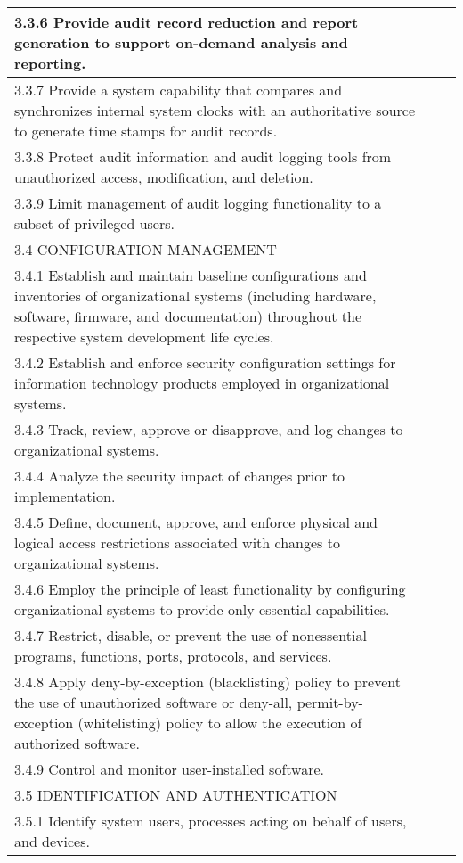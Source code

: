 \begin{longtable} {|p{}|p{}|p{} |}
{3.3.6 Provide audit record reduction and report generation to support on-demand analysis and reporting.}&& \\ \hline
{3.3.7 Provide a system capability that compares and synchronizes internal system clocks with an authoritative source to generate time stamps for audit records.}&& \\ \hline
{3.3.8 Protect audit information and audit logging tools from unauthorized access, modification, and deletion.}&& \\ \hline
{3.3.9 Limit management of audit logging functionality to a subset of privileged users.}&& \\ \hline
{3.4 CONFIGURATION MANAGEMENT}&& \\ \hline
{3.4.1 Establish and maintain baseline configurations and inventories of organizational systems (including hardware, software, firmware, and documentation) throughout the respective system development life cycles.}&& \\ \hline
{3.4.2 Establish and enforce security configuration settings for information technology products employed in organizational systems.}&& \\ \hline
{3.4.3 Track, review, approve or disapprove, and log changes to organizational systems.}&& \\ \hline
{3.4.4 Analyze the security impact of changes prior to implementation.}&& \\ \hline
{3.4.5 Define, document, approve, and enforce physical and logical access restrictions associated with changes to organizational systems.}&& \\ \hline
{3.4.6 Employ the principle of least functionality by configuring organizational systems to provide only essential capabilities.}&& \\ \hline
{3.4.7 Restrict, disable, or prevent the use of nonessential programs, functions, ports, protocols, and services.}&& \\ \hline
{3.4.8 Apply deny-by-exception (blacklisting) policy to prevent the use of unauthorized software or deny-all, permit-by-exception (whitelisting) policy to allow the execution of authorized software.}&& \\ \hline
{3.4.9 Control and monitor user-installed software.}&& \\ \hline
{3.5 IDENTIFICATION AND AUTHENTICATION}&& \\ \hline
{3.5.1 Identify system users, processes acting on behalf of users, and devices.}&& \\ \hline

\end{longtable}
